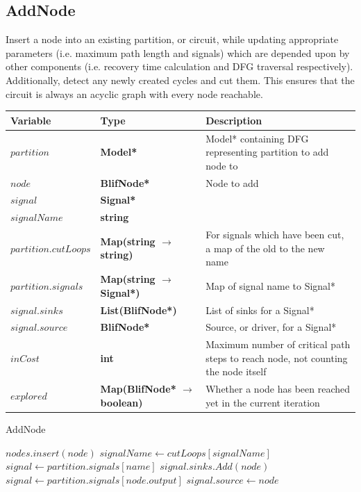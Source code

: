 \documentclass[12pt,final,oneside]{article} %
\begin{document}
\newpage
\subsection{AddNode}
Insert a node into an existing partition, or circuit, while updating appropriate parameters (i.e. maximum path length and signals) which are depended upon by other components (i.e. recovery time calculation and \ac{DFG} traversal respectively).
Additionally, detect any newly created cycles and cut them.
This ensures that the circuit is always an acyclic graph with every node reachable.
\begin{algorithm}
    \begin{center}
        \begin{tabularx}{\linewidth}{llX}
        \toprule
        Variable & Type & Description\\
        \midrule
        $partition$ &\bf  Model* & Model* containing DFG representing partition to add node to\\
        $node$ &\bf  BlifNode* & Node to add\\
        $signal$ &\bf  Signal* & \\
        $signalName$ &\bf  string & \\
        $partition.cutLoops$ &\bf  Map(string $\to$ string) & For signals which have been cut, a map of the old to the new name\\
        $partition.signals$ &\bf  Map(string $\to$ Signal*) & Map of signal name to Signal* \\
        $signal.sinks$ &\bf  List(BlifNode*) & List of sinks for a Signal* \\
        $signal.source$ &\bf  BlifNode* & Source, or driver, for a Signal* \\
        $inCost$ &\bf  int & Maximum number of critical path steps to reach node, not counting the node itself \\
        $explored$ &\bf  Map(BlifNode* $\to$ boolean) & Whether a node has been reached yet in the current iteration \\ 
        \bottomrule
        \end{tabularx}
    \end{center}
   \caption{AddNode}\label{addnode}
   \begin{algorithmic}[1]
            \State $nodes.insert(node)$
                  \State $signalName \gets cutLoops[signalName]$ 
               \EndIf
               \State $signal \gets partition.signals[name]$
               \State $signal.sinks.Add(node)$
            \EndFor
            \State $signal \gets partition.signals[node.output]$
            \State $signal.source \gets node$


\end{algorithmic}
\end{algorithm}
\end{document}
